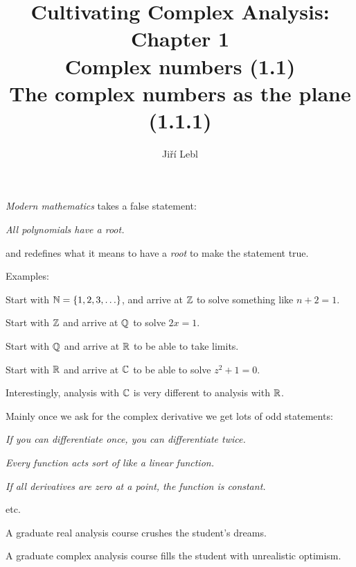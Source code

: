 \documentclass[10pt,aspectratio=169]{beamer}
\author{Ji\v{r}\'i Lebl}
\institute[OSU]{%
Departemento pri Matematiko de Oklahoma {\^S}tata Universitato}
\title{Cultivating Complex Analysis: Chapter 1\\Complex numbers (1.1)\\%
The complex numbers as the plane (1.1.1)}
\date{}
\begin{document}
\begin{frame}
\titlepage
\end{frame}

\begin{frame}
\emph{Modern mathematics} takes a false statement:

\medskip

\emph{All polynomials have a root.}

\medskip
\pause

and redefines what it means to have a \emph{root}
to make the statement true.

\medskip
\pause

Examples:

Start with ${\mathbb{N}} = \{ 1,2,3,\ldots \}$,
and arrive at ${\mathbb{Z}}$ to solve something like $n+2=1$.

\medskip
\pause

Start with ${\mathbb{Z}}$ and arrive at ${\mathbb{Q}}$ to solve
$2x=1$.

\medskip
\pause

Start with ${\mathbb{Q}}$ and arrive at ${\mathbb{R}}$ to be able to take limits.

\medskip
\pause

Start with ${\mathbb{R}}$ and arrive at ${\mathbb{C}}$ to be able to solve $z^2+1=0$.
\end{frame}

\begin{frame}
Interestingly, analysis with ${\mathbb{C}}$ is very different to analysis with ${\mathbb{R}}$.

\medskip
\pause

Mainly once we ask for the complex derivative we get lots of odd statements:

\medskip

\emph{If you can differentiate once, you can differentiate twice.}

\pause
\emph{Every function acts sort of like a linear function.}

\pause
\emph{If all derivatives are zero at a point, the function is constant.}

\pause
etc.

\medskip
\pause

A graduate real analysis course crushes the student's dreams.

\medskip
\pause

A graduate complex analysis course fills the student with unrealistic
optimism.

\end{frame}
\end{document}
